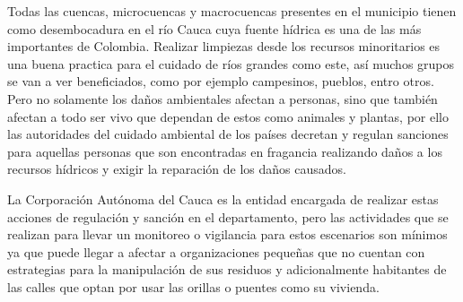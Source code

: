   Todas las cuencas, microcuencas y macrocuencas presentes en el municipio tienen como desembocadura en el río Cauca cuya fuente hídrica es una de las más importantes de Colombia. Realizar limpiezas desde los recursos minoritarios es una buena practica para el cuidado de ríos grandes como este, así muchos grupos se van a ver beneficiados, como por ejemplo campesinos, pueblos, entro otros. Pero no solamente los daños ambientales afectan a personas, sino que también afectan a todo ser vivo que dependan de estos como animales y plantas, por ello las autoridades del cuidado ambiental de los países decretan y regulan sanciones para aquellas personas que son encontradas en fragancia realizando daños a los recursos hídricos y exigir la reparación de los daños causados.

  La Corporación Autónoma del Cauca es la entidad encargada de realizar estas acciones de regulación y sanción en el departamento, pero las actividades que se realizan para llevar un monitoreo o vigilancia para estos escenarios son mínimos ya que puede llegar a afectar a organizaciones pequeñas que no cuentan con estrategias para la manipulación de sus residuos y adicionalmente habitantes de las calles que optan por usar las orillas o puentes como su vivienda.
